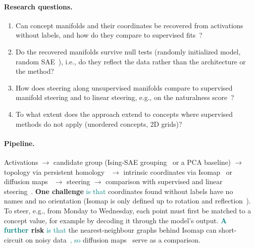 \documentclass[11pt,a4paper]{article}
\newcommand{\fromnotes}[1]{\textcolor{green!50!black}{#1}}
\newcommand{\fromclaude}[1]{\textcolor{orange!85!black}{#1}}
\newcommand{\fromprose}[1]{\textcolor{teal}{#1}}
\newcommand{\fromnotes}[1]{#1}
\newcommand{\fromclaude}[1]{#1}
\newcommand{\fromprose}[1]{#1}
\begin{document}
\paragraph{Research questions.}
\begin{enumerate}[label=RQ\arabic*:]
  \item \fromclaude{Can concept manifolds and their coordinates be recovered from activations without labels, and how do they compare to supervised fits~\cite{wurgaft2026manifoldsteering}?}
  \item \fromclaude{Do the recovered manifolds survive null tests (randomly initialized model, random SAE~\cite{korznikov2026sanity}), i.e., do they reflect the data rather than the architecture or the method?}
  \item \fromclaude{How does steering along unsupervised manifolds compare to supervised manifold steering and to linear steering, e.g., on the naturalness score~\cite{wurgaft2026manifoldsteering}?}
  \item \fromclaude{To what extent does the approach extend to concepts where supervised methods do not apply (unordered concepts, 2D grids)?}
\end{enumerate}

\paragraph{Pipeline.}
\fromnotes{Activations $\to$ candidate group (Ising-SAE grouping~\cite{bhalla2026saemanifolds} or a PCA baseline) $\to$ topology via persistent homology~\cite{tauzin2021giotto} $\to$ intrinsic coordinates via Isomap~\cite{tenenbaum2000isomap} or diffusion maps~\cite{coifman2006diffusion} $\to$ steering $\to$ comparison with supervised and linear steering~\cite{wurgaft2026manifoldsteering}.}
\fromclaude{\textbf{One challenge} \fromprose{is that} coordinates found without labels have no names and no orientation (Isomap is only defined up to rotation and reflection~\cite{tenenbaum2000isomap}). To steer, e.g., from Monday to Wednesday, each point must first be matched to a concept value, for example by decoding it through the model's output.}
\fromclaude{\textbf{\fromprose{A further} risk} \fromprose{is that} the nearest-neighbour graphs behind Isomap can short-circuit on noisy data~\cite{modell2025origins}\fromprose{, so} diffusion maps~\cite{coifman2006diffusion} serve as a comparison.}
\end{document}
